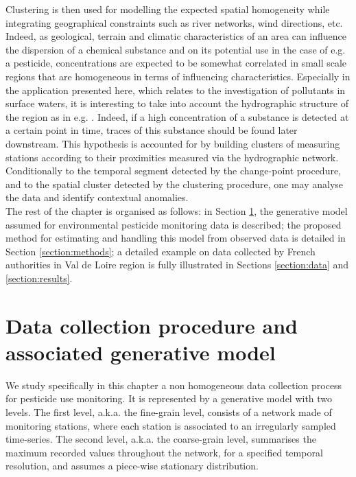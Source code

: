 Clustering is then used for modelling the expected spatial homogeneity while integrating geographical constraints such as river networks, wind directions, etc. Indeed, as geological, terrain and climatic characteristics of an area can influence the dispersion of a chemical substance and on its potential use in the case of e.g. a pesticide, concentrations are expected to be somewhat correlated in small scale regions that are homogeneous in terms of influencing characteristics. Especially in the application presented here, which relates to the investigation of pollutants in surface waters, it is interesting to take into account the hydrographic structure of the region as in e.g. \cite{doi:10.1080/07474946.2020.1826796}. Indeed, if a high concentration of a substance is detected at a certain point in time, traces of this substance should be found later downstream.
This hypothesis is accounted for by building clusters of measuring stations according to their proximities measured via the hydrographic network. \\
Conditionally to the temporal segment detected by the change-point procedure, and to the spatial cluster detected by the clustering procedure, one may analyse the data and identify contextual anomalies. \\
The rest of the chapter is organised as follows: in Section \ref{section:data:model}, the generative model assumed for environmental pesticide monitoring data is described; the proposed method for estimating and handling this model from observed data is detailed in Section \ref{section:methods}; a detailed example on data collected by French authorities in Val de Loire region is fully illustrated in Sections \ref{section:data} and \ref{section:results}. 

\section{Data collection procedure and associated generative model}\label{section:data:model}

We study specifically in this chapter a non homogeneous data collection process for pesticide use monitoring. It is represented by a generative model with two levels. The first level, a.k.a. the fine-grain level, consists of a network made of monitoring stations, where each station is associated to an irregularly sampled time-series. The second level, a.k.a. the coarse-grain level, summarises the maximum recorded values throughout the network, for a specified temporal resolution, and assumes a piece-wise stationary distribution. 

